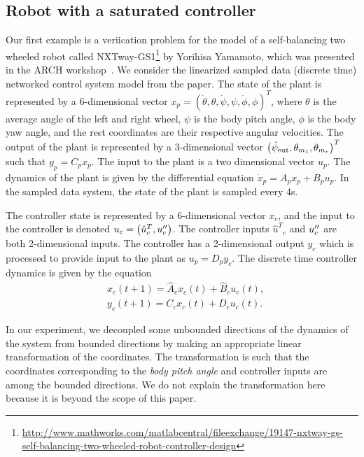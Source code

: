 \subsection{Robot with a saturated controller}
Our first example is a veriication problem for the model of a
self-balancing two wheeled robot called
NXTway-GS1\footnote{\url{http://www.mathworks.com/matlabcentral/fileexchange/19147-nxtway-gs-self-balancing-two-wheeled-robot-controller-design}}
by Yorihisa Yamamoto, which was presented in the ARCH
workshop~\cite{heinz2014benchmark}. We consider the linearized sampled
data (discrete time) networked control system model from the paper.
The state of the plant is represented by a 6-dimensional vector
$x_p=(\dot{\theta},\theta,\dot{\psi},\psi,\dot{\phi},\phi)^T$, where
$\theta$ is the average angle of the left and right wheel, $\psi$ is
the body pitch angle, $\phi$ is the body yaw angle, and the rest
coordinates are their respective angular velocities.  The output of
the plant is represented by a 3-dimensional vector
$\left(\dot{\psi}_{\operatorname*{out}},\theta_{m_1},\theta_{m_r}\right)^T$
such that $y_p=C_px_p$.  The input to the plant is a two dimensional
vector $u_p$.  The dynamics of the plant is given by the differential
equation $\dot{x}_p=A_px_p+B_pu_p$.  In the sampled data system, the
state of the plant is sampled every 4s.

The controller state is represented by a 6-dimensional vector $x_c$,
and the input to the controller is denoted
$u_c=\left({\hat{u}^T}_c,u^{\prime\prime}_c\right)$.  The controller inputs
${\hat{u}^T}_c$ and $u^{\prime\prime}_c$ are both 2-dimensional inputs.  The
controller has a 2-dimensional output $y_c$ which is processed to
provide input to the plant as $u_p=D_py_c$.  The discrete time
controller dynamics is given by the equation
%
\begin{align*}
  & x_c(t+1)=\hat{A}_cx_c(t)+\hat{B}_cu_c(t),\\
  & y_c(t+1)=C_cx_c(t)+D_cu_c(t).
\end{align*}
%




In our experiment, we decoupled some unbounded directions of
the dynamics of the system from bounded directions by making an
appropriate linear transformation of the coordinates.  The
transformation is such that the coordinates corresponding to the
\emph{body pitch angle} and controller inputs are among the bounded
directions.  We do not explain the transformation here because it is
beyond the scope of this paper.


